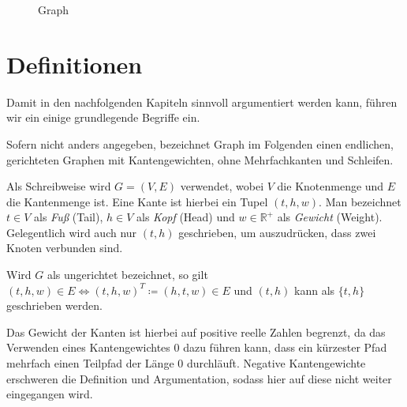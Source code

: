 \begin{figure}[ht]
  \caption{Graph}
  \label{graphs:fig:beispielgraph}
\end{figure}

\section{Definitionen}
Damit in den nachfolgenden Kapiteln sinnvoll argumentiert werden kann, führen wir ein einige grundlegende Begriffe ein.

\begin{definition}[Graph]
  Sofern nicht anders angegeben, bezeichnet Graph im Folgenden einen endlichen, gerichteten Graphen mit Kantengewichten, ohne Mehrfachkanten und Schleifen.

  Als Schreibweise wird $G = (V, E)$ verwendet, wobei $V$ die Knotenmenge und $E$ die Kantenmenge ist. Eine Kante ist hierbei ein Tupel $(t, h, w)$. Man bezeichnet $t \in V$ als \emph{Fuß} (Tail), $h \in V$ als \emph{Kopf} (Head) und $w \in \mathbb{R}^+$ als \emph{Gewicht} (Weight). Gelegentlich wird auch nur $(t, h)$ geschrieben, um auszudrücken, dass zwei Knoten verbunden sind.

  Wird $G$ als ungerichtet bezeichnet, so gilt $(t, h, w) \in E \Leftrightarrow (t, h, w)^T \coloneq (h, t, w) \in E$ und $(t, h)$ kann als $\{ t, h \}$ geschrieben werden.
\end{definition}

Das Gewicht der Kanten ist hierbei auf positive reelle Zahlen begrenzt, da das Verwenden eines Kantengewichtes $0$ dazu führen kann, dass ein kürzester Pfad mehrfach einen Teilpfad der Länge 0 durchläuft.
Negative Kantengewichte erschweren die Definition und Argumentation, sodass hier auf diese nicht weiter eingegangen wird.

